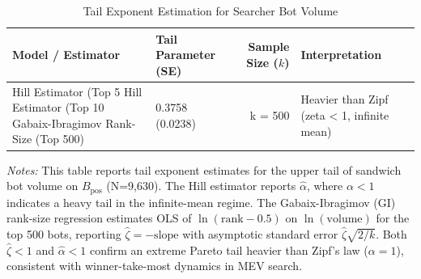 \begin{table}[htbp]
\centering
\caption{Tail Exponent Estimation for Searcher Bot Volume}
\label{tab:tail_estimates}
\begin{tabular}{llrl}
\toprule
Model / Estimator & Tail Parameter (SE) & Sample Size ($k$) & Interpretation \\
\midrule
Hill Estimator (Top 5%
Hill Estimator (Top 10%
Gabaix-Ibragimov Rank-Size (Top 500) & 0.3758 (0.0238) & k = 500 & Heavier than Zipf (zeta < 1, infinite mean) \\
\bottomrule
\end{tabular}
\vspace{0.2cm}
\begin{minipage}{\linewidth}
\small
\textit{Notes:} This table reports tail exponent estimates for the upper tail of sandwich bot volume on $B_{\text{pos}}$ (N=9,630). The Hill estimator reports $\hat{\alpha}$, where $\alpha < 1$ indicates a heavy tail in the infinite-mean regime. The Gabaix-Ibragimov (GI) rank-size regression estimates OLS of $\ln(\text{rank} - 0.5)$ on $\ln(\text{volume})$ for the top 500 bots, reporting $\hat{\zeta} = -\text{slope}$ with asymptotic standard error $\hat{\zeta}\sqrt{2/k}$. Both $\hat{\zeta} < 1$ and $\hat{\alpha} < 1$ confirm an extreme Pareto tail heavier than Zipf's law ($\alpha = 1$), consistent with winner-take-most dynamics in MEV search.
\end{minipage}
\end{table}
